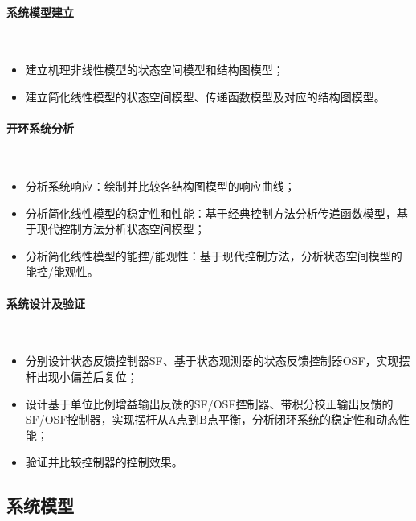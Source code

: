 \documentclass[UTF8]{article}
\begin{document}
\paragraph{系统模型建立}~{}
\begin{itemize}
	\item 建立机理非线性模型的状态空间模型和结构图模型；
	\item 建立简化线性模型的状态空间模型、传递函数模型及对应的结构图模型。
\end{itemize}

\paragraph{开环系统分析}~{}
\begin{itemize}
	\item 分析系统响应：绘制并比较各结构图模型的响应曲线；
	\item 分析简化线性模型的稳定性和性能：基于经典控制方法分析传递函数模型，基于现代控制方法分析状态空间模型；
	\item 分析简化线性模型的能控/能观性：基于现代控制方法，分析状态空间模型的能控/能观性。
\end{itemize}

\paragraph{系统设计及验证}~{}
\begin{itemize}
	\item 分别设计状态反馈控制器SF、基于状态观测器的状态反馈控制器OSF，实现摆杆出现小偏差后复位；
	\item 设计基于单位比例增益输出反馈的SF/OSF控制器、带积分校正输出反馈的SF/OSF控制器，实现摆杆从A点到B点平衡，分析闭环系统的稳定性和动态性能；
	\item 验证并比较控制器的控制效果。
\end{itemize}


\subsection{系统模型}
\end{document}
